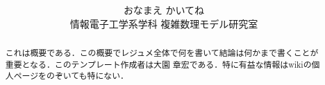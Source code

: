 \documentclass [10pt] {jsarticle}
\title {\Huge\textgt {タイトル} \vspace {0.5zw} }
\date {}
\author {おなまえ かいてね\\情報電子工学系学科 複雑数理モデル研究室}
\renewcommand{\thesection}{\arabic{section}.}
\begin{document}
\maketitle
\vspace{-7mm}
\begin{abstract}
これは概要である．この概要でレジュメ全体で何を書いて結論は何かまで書くことが重要となる．このテンプレート作成者は大園 章宏である．特に有益な情報はwikiの個人ページをのぞいても特にない．
\end{abstract}


\makeatletter
\newenvironment{tablehere}
{\def\@captype{table}}
{}
\newenvironment{figurehere}
{\def\@captype{figure}}
{}

\renewcommand{\thefigure}{%
\thesection\arabic{figure}}



\makeatother
\end{document}
